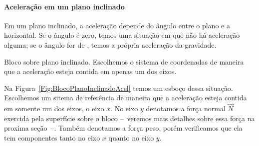 \paragraph{Aceleração em um plano inclinado}

Em um plano inclinado, a aceleração depende do ângulo entre o plano e a horizontal. Se o ângulo é zero, temos uma situação em que não há aceleração alguma; se o ângulo for de , temos a própria aceleração da gravidade.

\begin{marginfigure}
\centering
{}
\caption{Bloco sobre plano inclinado. Escolhemos o sistema de coordenadas de maneira que a aceleração esteja contida em apenas um dos eixos.\label{Fig:BlocoPlanoInclinadoAcel}}
\end{marginfigure}

Na Figura~\ref{Fig:BlocoPlanoInclinadoAcel} temos um esboço dessa situação. Escolhemos um sitema de referência de maneira que a aceleração esteja contida em somente um dos eixos, o eixo $x$. No eixo $y$ denotamos a força normal $\vec{N}$ exercida pela superfície sobre o bloco --~veremos mais detalhes sobre essa força na proxima seção~--. Também denotamos a força peso, porém verificamos que ela tem componentes tanto no eixo $x$ quanto no eixo $y$.

